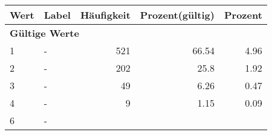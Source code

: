      \begin{longtable}{lXrrr}
     \toprule
     \textbf{Wert} & \textbf{Label} & \textbf{Häufigkeit} & \textbf{Prozent(gültig)} & \textbf{Prozent} \\
     \endhead
     \midrule
     \multicolumn{5}{l}{\textbf{Gültige Werte}}\\

     1 &
     \multicolumn{1}{X}{ -  } &


       \num{521} &
       \num[round-mode=places,round-precision=2]{66,54} &
         \num[round-mode=places,round-precision=2]{4,96} \\

     2 &
     \multicolumn{1}{X}{ -  } &


       \num{202} &
       \num[round-mode=places,round-precision=2]{25,8} &
         \num[round-mode=places,round-precision=2]{1,92} \\

     3 &
     \multicolumn{1}{X}{ -  } &


       \num{49} &
       \num[round-mode=places,round-precision=2]{6,26} &
         \num[round-mode=places,round-precision=2]{0,47} \\

     4 &
     \multicolumn{1}{X}{ -  } &


       \num{9} &
       \num[round-mode=places,round-precision=2]{1,15} &
         \num[round-mode=places,round-precision=2]{0,09} \\

     6 &
     \multicolumn{1}{X}{ -  } &



\end{longtable}
